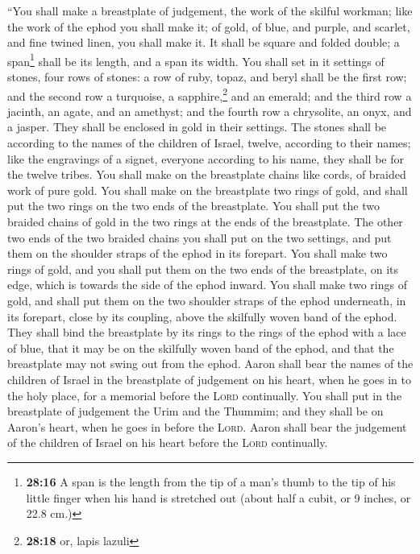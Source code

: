  ``You shall make a breastplate of judgement, the work of
the skilful workman; like the work of the ephod you shall make it; of
gold, of blue, and purple, and scarlet, and fine twined linen, you shall
make it.  It shall be square and folded double; a
span\footnote{\textbf{28:16} A span is the length from the tip of a
  man's thumb to the tip of his little finger when his hand is stretched
  out (about half a cubit, or 9 inches, or 22.8 cm.)} shall be its
length, and a span its width.  You shall set in it
settings of stones, four rows of stones: a row of ruby, topaz, and beryl
shall be the first row;  and the second row a turquoise,
a sapphire,\footnote{\textbf{28:18} or, lapis lazuli} and an emerald;
 and the third row a jacinth, an agate, and an amethyst;
 and the fourth row a chrysolite, an onyx, and a jasper.
They shall be enclosed in gold in their settings.  The
stones shall be according to the names of the children of Israel,
twelve, according to their names; like the engravings of a signet,
everyone according to his name, they shall be for the twelve tribes.
 You shall make on the breastplate chains like cords, of
braided work of pure gold.  You shall make on the
breastplate two rings of gold, and shall put the two rings on the two
ends of the breastplate.  You shall put the two braided
chains of gold in the two rings at the ends of the breastplate.
 The other two ends of the two braided chains you shall
put on the two settings, and put them on the shoulder straps of the
ephod in its forepart.  You shall make two rings of gold,
and you shall put them on the two ends of the breastplate, on its edge,
which is towards the side of the ephod inward.  You shall
make two rings of gold, and shall put them on the two shoulder straps of
the ephod underneath, in its forepart, close by its coupling, above the
skilfully woven band of the ephod.  They shall bind the
breastplate by its rings to the rings of the ephod with a lace of blue,
that it may be on the skilfully woven band of the ephod, and that the
breastplate may not swing out from the ephod.  Aaron
shall bear the names of the children of Israel in the breastplate of
judgement on his heart, when he goes in to the holy place, for a
memorial before the \textsc{Lord} continually.  You shall
put in the breastplate of judgement the Urim and the Thummim; and they
shall be on Aaron's heart, when he goes in before the \textsc{Lord}.
Aaron shall bear the judgement of the children of Israel on his heart
before the \textsc{Lord} continually.

